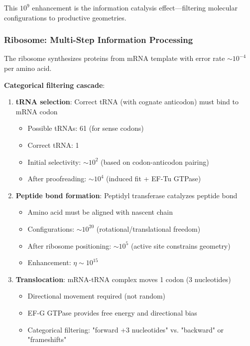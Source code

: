 \documentclass[11pt,a4paper]{article}
\begin{document}
This $10^9$ enhancement is the information catalysis effect—filtering molecular configurations to productive geometries.

\subsubsection{Ribosome: Multi-Step Information Processing}

The ribosome synthesizes proteins from mRNA template with error rate $\sim 10^{-4}$ per amino acid.

\textbf{Categorical filtering cascade}:

\begin{enumerate}
\item \textbf{tRNA selection}: Correct tRNA (with cognate anticodon) must bind to mRNA codon
  \begin{itemize}
  \item Possible tRNAs: 61 (for sense codons)
  \item Correct tRNA: 1
  \item Initial selectivity: $\sim 10^2$ (based on codon-anticodon pairing)
  \item After proofreading: $\sim 10^4$ (induced fit + EF-Tu GTPase)
  \end{itemize}

\item \textbf{Peptide bond formation}: Peptidyl transferase catalyzes peptide bond
  \begin{itemize}
  \item Amino acid must be aligned with nascent chain
  \item Configurations: $\sim 10^{20}$ (rotational/translational freedom)
  \item After ribosome positioning: $\sim 10^5$ (active site constrains geometry)
  \item Enhancement: $\eta \sim 10^{15}$
  \end{itemize}

\item \textbf{Translocation}: mRNA-tRNA complex moves 1 codon (3 nucleotides)
  \begin{itemize}
  \item Directional movement required (not random)
  \item EF-G GTPase provides free energy and directional bias
  \item Categorical filtering: "forward +3 nucleotides" vs. "backward" or "frameshifts"
  \end{itemize}
\end{enumerate}
\end{document}
